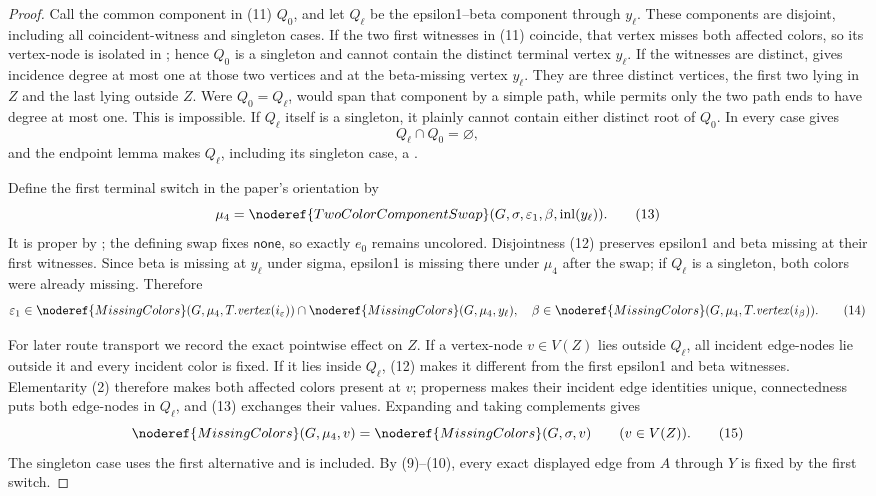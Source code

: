 \begin{proof}
Call the common component in (11) $Q_0$, and let $Q_\ell$ be the
epsilon1--beta component through $y_\ell$.  These components are
disjoint, including all coincident-witness and singleton cases.  If the
two first witnesses in (11) coincide, that vertex misses both affected
colors, so its vertex-node is isolated in
; hence $Q_0$ is a singleton and cannot
contain the distinct terminal vertex $y_\ell$.  If the witnesses are
distinct,  gives incidence
degree at most one at those two vertices and at the beta-missing vertex
$y_\ell$.  They are three distinct vertices, the first two lying in
$Z$ and the last lying outside $Z$.  Were $Q_0=Q_\ell$,
 would span that component by a
simple path, while  permits
only the two path ends to have degree at most one.  This is impossible.
If $Q_\ell$ itself is a singleton, it plainly cannot contain either
distinct root of $Q_0$.  In every case
 gives
\[
                              Q_\ell\cap Q_0=\varnothing,      \tag{12}
\]
and the endpoint lemma makes $Q_\ell$, including its singleton case, a
.

Define the first terminal switch in the paper's orientation by
\[
 \mu _4=\noderef{TwoColorComponentSwap}
   (G,\sigma,\varepsilon _1,\beta,\operatorname{inl}(y_\ell)). \tag{13}
\]
It is proper by ; the defining
swap fixes $\mathsf{none}$, so exactly $e_0$ remains uncolored.
Disjointness (12) preserves epsilon1 and beta missing at their first
witnesses.  Since beta is missing at $y_\ell$ under sigma, epsilon1 is
missing there under $\mu _4$ after the swap; if $Q_\ell$ is a singleton,
both colors were already missing.  Therefore
\[
 \varepsilon _1\in\noderef{MissingColors}
    (G,\mu _4,T.\mathit{vertex}(i_\varepsilon))
      \cap\noderef{MissingColors}(G,\mu _4,y_\ell),
 \quad
 \beta\in\noderef{MissingColors}
    (G,\mu _4,T.\mathit{vertex}(i_\beta)).                    \tag{14}
\]

For later route transport we record the exact pointwise effect on $Z$.
If a vertex-node $v\in V(Z)$ lies outside $Q_\ell$, all incident
edge-nodes lie outside it and every incident color is fixed.  If it lies
inside $Q_\ell$, (12) makes it different from the first epsilon1 and
beta witnesses.  Elementarity (2) therefore makes both affected colors
present at $v$; properness makes their incident edge identities unique,
connectedness puts both edge-nodes in $Q_\ell$, and (13) exchanges their
values.  Expanding  and taking complements gives
\[
 \noderef{MissingColors}(G,\mu _4,v)
   =\noderef{MissingColors}(G,\sigma,v)\qquad(v\in V(Z)).      \tag{15}
\]
The singleton case uses the first alternative and is included.  By
(9)--(10), every exact displayed edge from $A$ through $Y$ is fixed by
the first switch.


\end{proof}

